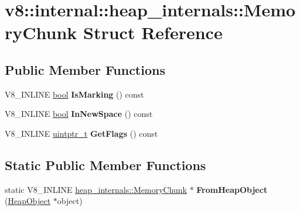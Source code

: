 \hypertarget{structv8_1_1internal_1_1heap__internals_1_1MemoryChunk}{}\section{v8\+:\+:internal\+:\+:heap\+\_\+internals\+:\+:Memory\+Chunk Struct Reference}
\label{structv8_1_1internal_1_1heap__internals_1_1MemoryChunk}
\subsection*{Public Member Functions}
\begin{DoxyCompactItemize}
\item 
\mbox{\label{structv8_1_1internal_1_1heap__internals_1_1MemoryChunk_a006f8c55b6ba4e8d1746a7862a8c90f1}} 
V8\+\_\+\+I\+N\+L\+I\+NE \mbox{\hyperlink{classbool}{bool}} {\bfseries Is\+Marking} () const
\item 
\mbox{\label{structv8_1_1internal_1_1heap__internals_1_1MemoryChunk_ae921ff0e998b0783398b57847e15ff9d}} 
V8\+\_\+\+I\+N\+L\+I\+NE \mbox{\hyperlink{classbool}{bool}} {\bfseries In\+New\+Space} () const
\item 
\mbox{\label{structv8_1_1internal_1_1heap__internals_1_1MemoryChunk_a923f5dbdfe6d292abfe86659777172b0}} 
V8\+\_\+\+I\+N\+L\+I\+NE \mbox{\hyperlink{classuintptr__t}{uintptr\+\_\+t}} {\bfseries Get\+Flags} () const
\end{DoxyCompactItemize}
\subsection*{Static Public Member Functions}
\begin{DoxyCompactItemize}
\item 
\mbox{\label{structv8_1_1internal_1_1heap__internals_1_1MemoryChunk_a9a62e2ff31d60d37f0301886276ba329}} 
static V8\+\_\+\+I\+N\+L\+I\+NE \mbox{\hyperlink{structv8_1_1internal_1_1heap__internals_1_1MemoryChunk}{heap\+\_\+internals\+::\+Memory\+Chunk}} $\ast$ {\bfseries From\+Heap\+Object} (\mbox{\hyperlink{classv8_1_1internal_1_1HeapObject}{Heap\+Object}} $\ast$object)
\end{DoxyCompactItemize}
